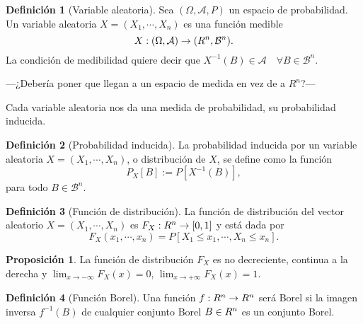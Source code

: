 \documentclass[10pt,a4paper]{article} %
\let\mathbb\relax
\theoremstyle{definition}
\newtheorem{definition}{Definición}[section]
\newtheorem{proposition}[theorem]{Proposición}
\begin{document}


\begin{definition}[Variable aleatoria]
    Sea $(\Omega, \mathcal{A}, P)$ un espacio de probabilidad. Un variable aleatoria $X=(X_1,\cdots, X_n)$ es una función medible \[
X:(\Omega, \mathcal{A}) \to (\mathbb{R}^n, \mathcal{B}^n).
\]
La condición de medibilidad quiere decir que $X^{-1}(B) \in \mathcal{A}\quad \forall B\in \mathcal{B}^n$.\\
\end{definition}

---¿Debería poner que llegan a un espacio de medida en vez de a $R^n$?---

Cada variable aleatoria nos da una medida de probabilidad, su probabilidad inducida.

\begin{definition}[Probabilidad inducida]
  La probabilidad inducida por un variable aleatoria $X=(X_1,\cdots, X_n)$, o distribución de $X$, se define como la función \[
P_X[B]:= P[X^{-1}(B)],
  \]
para todo $B \in \mathcal{B}^n$.
\end{definition}

\begin{definition}[Función de distribución]
  La función de distribución del vector aleatorio $X=(X_1,\cdots,X_n)$ es $F_X:\mathbb{R}^n\to[0,1]$ y está dada por\[
F_X(x_1,\cdots,x_n) = P[X_1\leq x_1,\cdots, X_n\leq x_n].
  \]
\end{definition}


\begin{proposition}
  La función de distribución $F_X$ es no decreciente, continua a la derecha y $\lim_{x\to - \infty}F_X(x) = 0$, $\lim_{x\to +\infty}F_X(x) = 1$.
\end{proposition}

\begin{definition}[Función Borel]
  Una función $f:\mathbb{R}^n\to \mathbb{R}^n$ será Borel si la imagen inversa $f^{-1}(B)$ de cualquier conjunto Borel $B\in \mathbb{R}^n$ es un conjunto Borel.
\end{definition}
\end{document}
